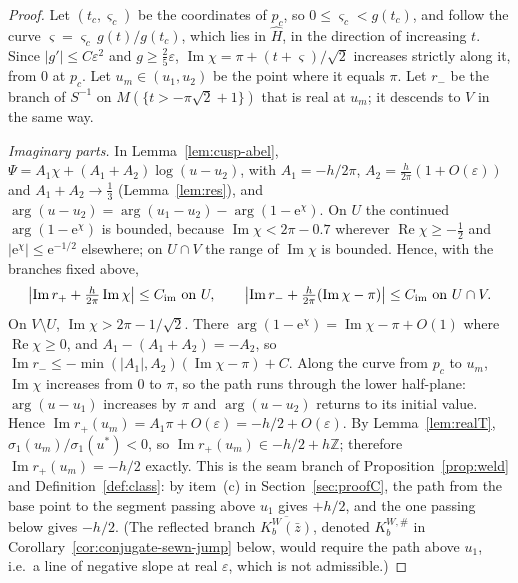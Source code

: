 \documentclass[11pt]{amsart}
\theoremstyle{definition}
\newcommand{\Kk}{K}
\newcommand{\eee}{\mathrm{e}}
\begin{document}
\begin{proof}
Let $(t_c,\varsigma_c)$ be the coordinates of $p_c$, so $0\le\varsigma_c<g(t_c)$, and
follow the curve $\varsigma=\varsigma_c\,g(t)/g(t_c)$, which lies in $\hat H$, in the direction
of increasing $t$.  Since $|g'|\le C\varepsilon^2$ and $g\ge\tfrac25\varepsilon$,
$\operatorname{Im}\chi=\pi+(t+\varsigma)/\sqrt2$ increases strictly along it, from $0$ at $p_c$.
Let $u_m\in(u_1,u_2)$ be the point where it equals $\pi$.  Let $r_-$ be the branch
of $S^{-1}$ on $M(\{t>-\pi\sqrt2+1\})$ that is real at $u_m$; it descends to $V$
in the same way.

\emph{Imaginary parts.}  In Lemma~\ref{lem:cusp-abel},
$\Psi=A_1\chi+(A_1+A_2)\log(u-u_2)$, with $A_1=-h/2\pi$,
$A_2=\tfrac h{2\pi}(1+O(\varepsilon))$ and $A_1+A_2\to\tfrac13$ (Lemma~\ref{lem:res}), and
$\arg(u-u_2)=\arg(u_1-u_2)-\arg(1-\eee^\chi)$.  On $U$ the continued
$\arg(1-\eee^\chi)$ is bounded, because $\operatorname{Im}\chi<2\pi-0.7$ wherever
$\operatorname{Re}\chi\ge-\tfrac12$ and $|\eee^\chi|\le\eee^{-1/2}$ elsewhere; on $U\cap V$ the range of
$\operatorname{Im}\chi$ is bounded.  Hence, with the branches fixed above,
\begin{equation}\label{eq:cusp-im}
 \bigl|\operatorname{Im}r_++\tfrac h{2\pi}\operatorname{Im}\chi\bigr|\le C_{\rm im}\ \text{on }U,\qquad
 \bigl|\operatorname{Im}r_-+\tfrac h{2\pi}(\operatorname{Im}\chi-\pi)\bigr|\le C_{\rm im}\ \text{on }U\cap V .
\end{equation}
On $V\setminus U$, $\operatorname{Im}\chi>2\pi-1/\sqrt2$.  There
$\arg(1-\eee^\chi)=\operatorname{Im}\chi-\pi+O(1)$ where $\operatorname{Re}\chi\ge0$, and
$A_1-(A_1+A_2)=-A_2$, so $\operatorname{Im}r_-\le-\min(|A_1|,A_2)(\operatorname{Im}\chi-\pi)+C$.  Along the
curve from $p_c$ to $u_m$, $\operatorname{Im}\chi$ increases from $0$ to $\pi$, so the path runs
through the lower half-plane: $\arg(u-u_1)$ increases by $\pi$ and
$\arg(u-u_2)$ returns to its initial value.  Hence
$\operatorname{Im}r_+(u_m)=A_1\pi+O(\varepsilon)=-h/2+O(\varepsilon)$.  By
Lemma~\ref{lem:realT}, $\sigma_1(u_m)/\sigma_1(u^*)<0$, so
$\operatorname{Im}r_+(u_m)\in-h/2+h\mathbb Z$; therefore $\operatorname{Im}r_+(u_m)=-h/2$ exactly.  This is
the seam branch of Proposition~\ref{prop:weld} and Definition~\ref{def:class}: by
item~(c) in Section~\ref{sec:proofC}, the path from the base point to the
segment passing above $u_1$ gives $+h/2$, and the one passing below gives
$-h/2$.  (The reflected branch $\overline{\Kk^W_b(\bar z)}$, denoted $\Kk^{W,\#}_b$ in Corollary~\ref{cor:conjugate-sewn-jump} below, would require the path above $u_1$,
i.e.\ a line of negative slope at real $\varepsilon$, which is not admissible.)


\end{proof}
\end{document}
